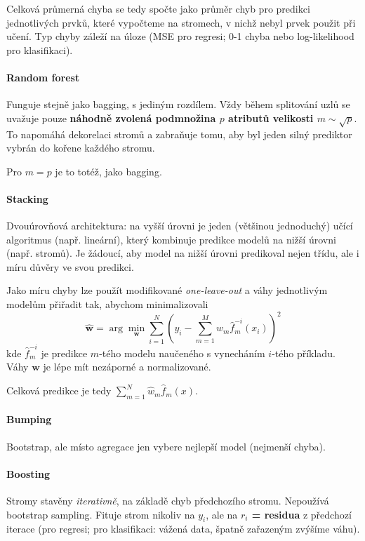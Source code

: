 \documentclass[11pt]{report} %
\renewcommand{\vec}[1]{\mathbf{#1}}
\numberwithin{equation}{section}
\begin{document}
Celková průmerná chyba se tedy spočte jako průměr chyb pro predikci jednotlivých prvků, které vypočteme na stromech, v nichž nebyl prvek použit při učení. Typ chyby záleží na úloze (MSE pro regresi; 0-1 chyba nebo log-likelihood pro klasifikaci).

\paragraph{Random forest}
Funguje stejně jako bagging, s jediným rozdílem. Vždy během splitování uzlů se uvažuje pouze \textbf{náhodně zvolená podmnožina $p$ atributů velikosti $m \sim \sqrt{p}$}. To napomáhá dekorelaci stromů a zabraňuje tomu, aby byl jeden silný prediktor vybrán do kořene každého stromu.

Pro $m = p$ je to totéž, jako bagging.

\paragraph{Stacking}
Dvouúrovňová architektura: na vyšší úrovni je jeden (většinou jednoduchý) učící algoritmus (např. lineární), který kombinuje predikce modelů na nižší úrovni (např. stromů). Je žádoucí, aby model na nižší úrovni predikoval nejen třídu, ale i míru důvěry ve svou predikci.

Jako míru chyby lze použít modifikované \textit{one-leave-out} a váhy jednotlivým modelům přiřadit tak, abychom minimalizovali
$$\hat{\vec{w}} = \arg\min_\vec{w} \sum_{i=1}^{N}\left(y_i - \sum_{m=1}^{M} w_m \hat{f}_m^{-i}(x_i) \right)^2$$
kde $\hat{f}^{-i}_m$ je predikce $m$-tého modelu naučeného s vynecháním $i$-tého příkladu. Váhy $\vec{w}$ je lépe mít nezáporné a normalizované.

Celková predikce je tedy $\sum_{m=1}^{N} \hat{w}_m \hat{f}_m(x)$.

\paragraph{Bumping}
Bootstrap, ale místo agregace jen vybere nejlepší model (nejmenší chyba).

\paragraph{Boosting}
Stromy stavěny \emph{iterativně}, na základě chyb předchozího stromu. Nepoužívá bootstrap sampling. Fituje strom nikoliv na $y_i$, ale na \textbf{$r_i$ = residua} z předchozí iterace (pro regresi; pro klasifikaci: vážená data, špatně zařazeným zvýšíme váhu).
\end{document}
